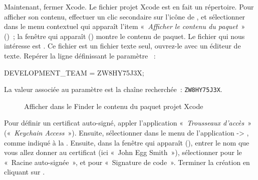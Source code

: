 Maintenant, fermer Xcode. Le fichier projet Xcode  est en fait un répertoire. Pour afficher son contenu, effectuer un clic secondaire sur l'icône de , et sélectionner dans le menu contextuel qui apparaît l'item «~\emph{Afficher le contenu du paquet}~» ()~; la fenêtre qui apparaît () montre le contenu de paquet. Le fichier qui nous intéresse est . Ce fichier est un fichier texte seul, ouvrez-le avec un éditeur de texte. Repérer la ligne définissant le paramètre ~:
\begin{SHELL}
DEVELOPMENT\_TEAM = ZW8HY75J3X;
\end{SHELL}
La valeur associée au paramètre  est la chaîne recherchée~: \texttt{ZW8HY75J3X}.

\begin{figure}[!t]
  \centering
  \hspace{1 cm}
  \caption{Afficher dans le Finder le contenu du paquet projet Xcode}
\end{figure}







Pour définir un certificat auto-signé, appler l'application «~\emph{Trousseaux d'accès}~» («~\emph{Keychain Access}~»). Ensuite, sélectionner dans le menu de l'application  -> , comme indiqué à la . Ensuite, dans la fenêtre qui apparaît (), entrer le nom que vous allez donner au certificat (ici «~John Egg Smith~»), sélectionner pour le  «~Racine auto-signée~», et pour  «~Signature de code~». Terminer la création en cliquant sur .


